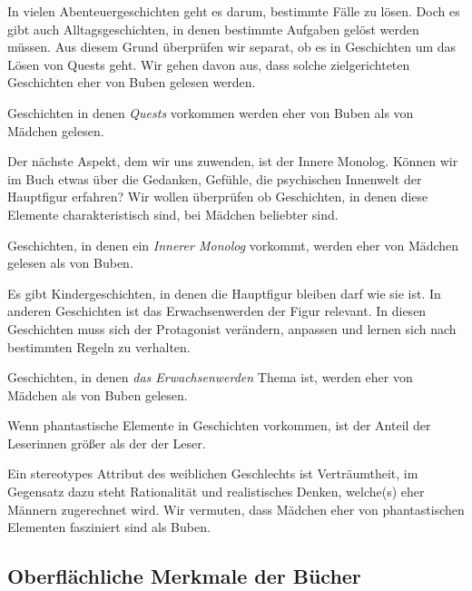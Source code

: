 In vielen Abenteuergeschichten geht es darum, bestimmte Fälle zu lösen.
Doch es gibt auch Alltagsgeschichten, in denen bestimmte Aufgaben gelöst
werden müssen. Aus diesem Grund überprüfen wir separat, ob es in
Geschichten um das Lösen von Quests geht. Wir gehen davon aus, dass
solche zielgerichteten Geschichten eher von Buben gelesen werden.

\begin{subhyp}\label{h4.2} Geschichten in denen \emph{Quests} vorkommen werden eher von Buben als von Mädchen gelesen. \end{subhyp}

Der nächste Aspekt, dem wir uns zuwenden, ist der Innere Monolog. Können
wir im Buch etwas über die Gedanken, Gefühle, die psychischen Innenwelt
der Hauptfigur erfahren? Wir wollen überprüfen ob Geschichten, in denen
diese Elemente charakteristisch sind, bei Mädchen beliebter sind.

\begin{subhyp}\label{h4.3} Geschichten, in denen ein \emph{Innerer Monolog} vorkommt, werden eher von Mädchen gelesen als von Buben. \end{subhyp}

Es gibt Kindergeschichten, in denen die Hauptfigur bleiben darf wie sie
ist. In anderen Geschichten ist das Erwachsenwerden der Figur relevant.
In diesen Geschichten muss sich der Protagonist verändern, anpassen und
lernen sich nach bestimmten Regeln zu verhalten.

\begin{subhyp}\label{h4.4} Geschichten, in denen \emph{das Erwachsenwerden} Thema ist, werden eher von Mädchen als von Buben gelesen. \end{subhyp}

\begin{subhyp}\label{h4.5} Wenn phantastische Elemente in Geschichten vorkommen, ist der Anteil der Leserinnen größer als der der Leser.
\end{subhyp}

Ein stereotypes Attribut des weiblichen Geschlechts ist Verträumtheit,
im Gegensatz dazu steht Rationalität und realistisches Denken, welche(s)
eher Männern zugerechnet wird. Wir vermuten, dass Mädchen eher von
phantastischen Elementen fasziniert sind als Buben.

\subsection{Oberflächliche Merkmale der Bücher}

